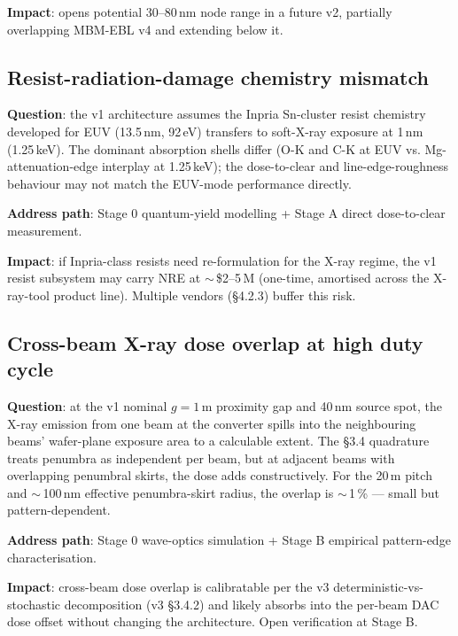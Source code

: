 \documentclass[11pt,letterpaper]{article}
\begin{document}
\textbf{Impact}: opens potential 30--80\,nm node range in a future v2, partially overlapping MBM-EBL v4 and extending below it.

\subsection{Resist-radiation-damage chemistry mismatch}

\textbf{Question}: the v1 architecture assumes the Inpria Sn-cluster resist chemistry developed for EUV (13.5\,nm, 92\,eV) transfers to soft-X-ray exposure at 1\,nm (1.25\,keV). The dominant absorption shells differ (O-K and C-K at EUV vs. Mg-attenuation-edge interplay at 1.25\,keV); the dose-to-clear and line-edge-roughness behaviour may not match the EUV-mode performance directly.

\textbf{Address path}: Stage 0 quantum-yield modelling + Stage A direct dose-to-clear measurement.

\textbf{Impact}: if Inpria-class resists need re-formulation for the X-ray regime, the v1 resist subsystem may carry NRE at $\sim$\,\$2--5\,M (one-time, amortised across the X-ray-tool product line). Multiple vendors (\S 4.2.3) buffer this risk.

\subsection{Cross-beam X-ray dose overlap at high duty cycle}

\textbf{Question}: at the v1 nominal $g = 1$\,\textmu m proximity gap and 40\,nm source spot, the X-ray emission from one beam at the converter spills into the neighbouring beams' wafer-plane exposure area to a calculable extent. The \S 3.4 quadrature treats penumbra as independent per beam, but at adjacent beams with overlapping penumbral skirts, the dose adds constructively. For the 20\,\textmu m pitch and $\sim$\,100\,nm effective penumbra-skirt radius, the overlap is $\sim$\,1\,\% --- small but pattern-dependent.

\textbf{Address path}: Stage 0 wave-optics simulation + Stage B empirical pattern-edge characterisation.

\textbf{Impact}: cross-beam dose overlap is calibratable per the v3 deterministic-vs-stochastic decomposition (v3 \S 3.4.2) and likely absorbs into the per-beam DAC dose offset without changing the architecture. Open verification at Stage B.

\end{document}
